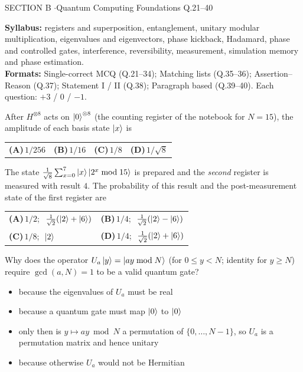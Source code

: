 \documentclass[11pt,a4paper]{article}
\newcommand{\optlabel}[1]{\textbf{(#1)}}
\newenvironment{qitem}[1]{\begin{list}{}{\setlength{\leftmargin}{3.3em}\setlength{\labelwidth}{3.1em}%
  \setlength{\labelsep}{0.2em}\setlength{\topsep}{3pt}\setlength{\parsep}{3pt}}\item[\textbf{Q.#1}\hfill]}{\end{list}}
\newcommand{\qsep}{\par\vspace{2pt}{\color{black!15}\hrule}\vspace{4pt}}
\begin{document}
\begin{sectionbanner}SECTION B \enspace$\cdot$\enspace Quantum Computing Foundations \hfill Q.21--40\end{sectionbanner}

{\small \textbf{Syllabus:} registers and superposition, entanglement, unitary modular multiplication, eigenvalues and eigenvectors, phase kickback, Hadamard, phase and controlled gates, interference, reversibility, measurement, simulation memory and phase estimation.\\ \textbf{Formats:} Single-correct MCQ (Q.21--34); Matching lists (Q.35--36); Assertion--Reason (Q.37); Statement I / II (Q.38); Paragraph based (Q.39--40). Each question: $+3$ / $0$ / $-1$.}
\par\medskip

\begin{qitem}{21}
After $H^{\otimes8}$ acts on $\ket{0}^{\otimes8}$ (the counting register of the notebook for $N = 15$), the amplitude of each basis state $\ket x$ is
\par\smallskip\noindent\begin{tabularx}{\linewidth}{@{}*{4}{L}@{}}
\optlabel{A}\,$1/256$ & \optlabel{B}\,$1/16$ & \optlabel{C}\,$1/8$ & \optlabel{D}\,$1/\sqrt8$
\end{tabularx}
\end{qitem}
\qsep

\begin{qitem}{22}
The state $\frac{1}{\sqrt8}\sum_{x=0}^{7}\ket x\ket{2^x \bmod 15}$ is prepared and the \emph{second} register is measured with result $4$. The probability
of this result and the post-measurement state of the first register are
\par\smallskip\noindent\begin{tabularx}{\linewidth}{@{}*{2}{L}@{}}
\optlabel{A}\,$1/2$; $\ \frac{1}{\sqrt2}(\ket2 + \ket6)$ & \optlabel{B}\,$1/4$; $\ \frac{1}{\sqrt2}(\ket2 - \ket6)$ \\[3pt]
\optlabel{C}\,$1/8$; $\ \ket2$ & \optlabel{D}\,$1/4$; $\ \frac{1}{\sqrt2}(\ket2 + \ket6)$
\end{tabularx}
\end{qitem}
\qsep

\begin{qitem}{23}
Why does the operator $U_a\ket y = \ket{ay \bmod N}$ (for $0 \le y < N$; identity for $y \ge N$) require $\gcd(a, N) = 1$ to be a valid quantum gate?
\begin{itemize}[leftmargin=2.6em, labelsep=0.4em, itemsep=2pt, topsep=3pt]
\item[\optlabel{A}] because the eigenvalues of $U_a$ must be real
\item[\optlabel{B}] because a quantum gate must map $\ket0$ to $\ket0$
\item[\optlabel{C}] only then is $y \mapsto ay \bmod N$ a permutation of $\{0, \dots, N-1\}$, so $U_a$ is a permutation matrix and hence unitary
\item[\optlabel{D}] because otherwise $U_a$ would not be Hermitian
\end{itemize}
\end{qitem}
\qsep
\end{document}
